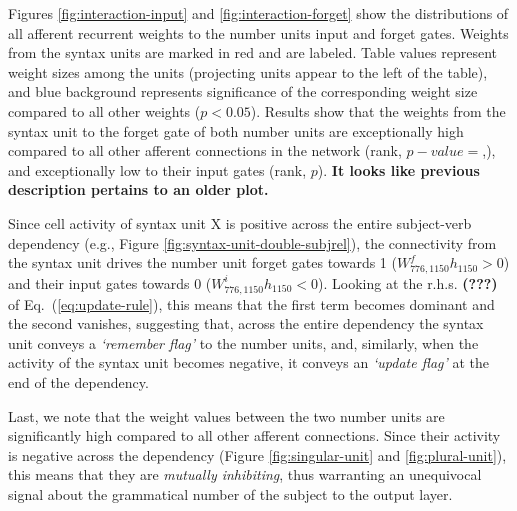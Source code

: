 
Figures \ref{fig:interaction-input} and \ref{fig:interaction-forget} show the distributions of all afferent recurrent weights to the number units input and forget gates. Weights from the syntax units are marked in red and are labeled. Table values represent weight sizes among the units (projecting units appear to the left of the table), and blue background represents significance of the corresponding weight size compared to all other weights ($p<0.05$). Results show that the weights from the syntax unit to the forget gate of both number units are exceptionally high compared to all other afferent connections in the network (rank, $p-value=$,), and exceptionally low to their input gates (rank, $p$). \textbf{It looks like previous description pertains to an older plot.} 

Since cell activity of syntax unit X is positive across the entire
subject-verb dependency (e.g., Figure
\ref{fig:syntax-unit-double-subjrel}), the connectivity from the
syntax unit drives the number unit forget gates towards 1
($W^f_{776, 1150}h_{1150}>0$) and their input gates towards 0
($W^i_{776, 1150}h_{1150}<0$). Looking at the r.h.s. \textbf{(???)} of
Eq.~(\ref{eq:update-rule}), this means that the first term becomes
  dominant and the second vanishes, suggesting that, across the entire
  dependency the syntax unit conveys a \textit{`remember flag'}
  to the number units, and, similarly, when the activity of the syntax
  unit becomes negative, it conveys an \textit{`update
    flag'} at the end of the dependency.

Last, we note that the weight values between the two number units are significantly high compared to all other afferent connections. Since their activity is negative across the dependency (Figure \ref{fig:singular-unit} and \ref{fig:plural-unit}), this means that they are \textit{mutually inhibiting}, thus warranting an unequivocal signal about the grammatical number of the subject to the output layer.

